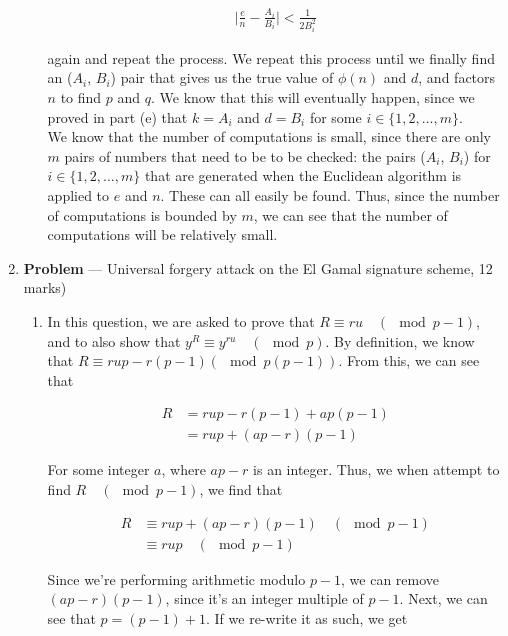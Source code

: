 \documentclass[11pt]{article}
\theoremstyle{definition}
\newcounter{problem}
\begin{document}
\begin{enumerate}
\begin{enumerate}
\begin{align*}
    \mid \frac{e}{n} - \frac{A_i}{B_i} \mid < \frac{1}{2B_i^2}
\end{align*}

again and repeat the process. We repeat this process until we finally find an ($A_i$, $B_i$) pair that gives us the true value of $\phi(n)$ and $d$, and factors $n$ to find $p$ and $q$. We know that this will eventually happen, since we proved in part (e) that $k = A_i$ and $d = B_i$ for some $i \in \{1, 2, \ldots, m\}$. \\

We know that the number of computations is small, since there are only $m$ pairs of numbers that need to be to be checked: the pairs ($A_i$, $B_i$) for $i \in \{1, 2, \ldots, m\}$ that are generated when the Euclidean algorithm is applied to $e$ and $n$. These can all easily be found. Thus, since the number of computations is bounded by $m$, we can see that the number of computations will be relatively small.

\end{enumerate}

\newpage

\item[] \textbf{Problem \theproblem} --- Universal forgery attack on the El Gamal signature
    scheme, 12 marks)

\begin{enumerate}

\item %
In this question, we are asked to prove that $R \equiv ru \quad (\mod{p - 1})$, and to also show that $y^R \equiv y^{ru} \quad (\mod{p})$. By definition, we know that $R \equiv rup - r(p - 1) (\mod{p(p-1)})$. From this, we can see that 

\begin{align*}
    R &= rup - r(p - 1) + ap(p-1) \\
    &= rup + (ap - r)(p-1)
\end{align*}

For some integer $a$, where $ap - r$ is an integer. Thus, we when attempt to find $R \quad (\mod{p-1})$, we find that

\begin{align*}
    R &\equiv rup + (ap - r)(p - 1) \quad (\mod{p - 1}) \\
    &\equiv rup \quad (\mod{p - 1})
\end{align*}

Since we're performing arithmetic modulo $p - 1$, we can remove $(ap - r)(p - 1)$, since it's an integer multiple of $p - 1$. Next, we can see that $p = (p - 1) + 1$. If we re-write it as such, we get


\end{enumerate}
\end{enumerate}
\end{document}
